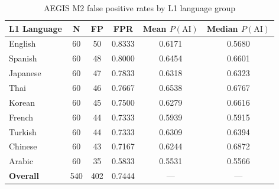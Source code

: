 \begin{table}[ht]
\centering
\caption{AEGIS M2 false positive rates by L1 language group}
\label{tab:fairness}
\begin{tabular}{lccccc}
\hline
\textbf{L1 Language} & \textbf{N} & \textbf{FP} & \textbf{FPR} & \textbf{Mean $P(\text{AI})$} & \textbf{Median $P(\text{AI})$} \\
\hline
English & 60 & 50 & 0.8333 & 0.6171 & 0.5680 \\
Spanish & 60 & 48 & 0.8000 & 0.6454 & 0.6601 \\
Japanese & 60 & 47 & 0.7833 & 0.6318 & 0.6323 \\
Thai & 60 & 46 & 0.7667 & 0.6538 & 0.6767 \\
Korean & 60 & 45 & 0.7500 & 0.6279 & 0.6616 \\
French & 60 & 44 & 0.7333 & 0.5939 & 0.5915 \\
Turkish & 60 & 44 & 0.7333 & 0.6309 & 0.6394 \\
Chinese & 60 & 43 & 0.7167 & 0.6244 & 0.6872 \\
Arabic & 60 & 35 & 0.5833 & 0.5531 & 0.5566 \\
\hline
\textbf{Overall} & 540 & 402 & 0.7444 & — & — \\
\hline
\end{tabular}
\end{table}